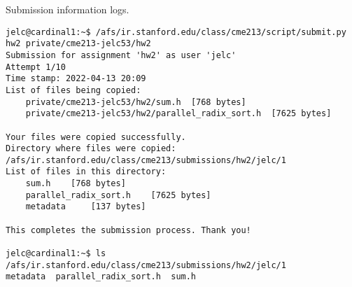 \documentclass[12pt,letterpaper,twoside]{article}
\begin{document}
Submission information logs.
\begin{verbatim}
jelc@cardinal1:~$ /afs/ir.stanford.edu/class/cme213/script/submit.py hw2 private/cme213-jelc53/hw2
Submission for assignment 'hw2' as user 'jelc'
Attempt 1/10
Time stamp: 2022-04-13 20:09
List of files being copied:
    private/cme213-jelc53/hw2/sum.h	 [768 bytes]
    private/cme213-jelc53/hw2/parallel_radix_sort.h	 [7625 bytes]

Your files were copied successfully.
Directory where files were copied: /afs/ir.stanford.edu/class/cme213/submissions/hw2/jelc/1
List of files in this directory:
    sum.h	 [768 bytes]
    parallel_radix_sort.h	 [7625 bytes]
    metadata	 [137 bytes]

This completes the submission process. Thank you!

jelc@cardinal1:~$ ls /afs/ir.stanford.edu/class/cme213/submissions/hw2/jelc/1
metadata  parallel_radix_sort.h  sum.h
\end{verbatim}
\end{document}
